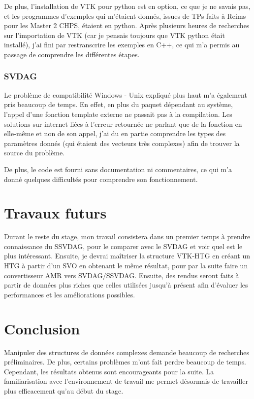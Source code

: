 \documentclass[12pt,a4paper,twoside]{article}
\begin{document}
    De plus, l'installation de VTK pour python est en option, ce que je ne savais pas, et les programmes d'exemples qui m'étaient
    donnés, issues de TPs faits à Reims pour les Master 2 CHPS, étaient en python. Après plusieurs heures de recherches sur l'importation de VTK
    (car je pensais toujours que VTK python était installé),
    j'ai fini par restranscrire les exemples en C++, ce qui m'a permis au passage de comprendre les différentes étapes.

    \subsubsection{SVDAG}

    Le problème de compatibilité Windows - Unix expliqué plus haut m'a également pris beaucoup de temps. En effet, en plus du paquet dépendant au système,
    l'appel d'une fonction template externe ne passait pas à la compilation. Les solutions sur internet liées à l'erreur
    retournée ne parlant que de la fonction en elle-même et non de son appel, j'ai du en partie comprendre les types des
    paramètres donnés (qui étaient des vecteurs très complexes) afin de trouver la source du problème.

    De plus, le code est fourni sans documentation ni commentaires, ce qui m'a donné quelques difficultés pour
    comprendre son fonctionnement.

    \newpage
    \section{Travaux futurs}

    Durant le reste du stage, mon travail consistera dans un premier temps à prendre connaissance du SSVDAG, pour le
    comparer avec le SVDAG et voir quel est le plus intéressant. Ensuite, je devrai maîtriser la structure VTK-HTG en créant un
    HTG à partir d'un SVO en obtenant le même résultat, pour par la suite faire un convertisseur AMR vers SVDAG/SSVDAG.
    Ensuite, des rendus seront faits à partir de données plus riches que celles utilisées jusqu'à présent afin d'évaluer les performances et
    les améliorations possibles.

    \section{Conclusion}                            %

    Manipuler des structures de données complexes demande beaucoup de recherches préliminaires. De plus, certains
    problèmes m'ont fait perdre beaucoup de temps.\\
    Cependant, les résultats obtenus sont encourageants pour la suite. La familiarisation avec l'environnement de travail
    me permet désormais de travailler plus efficacement qu'au début du stage.
\end{document}
